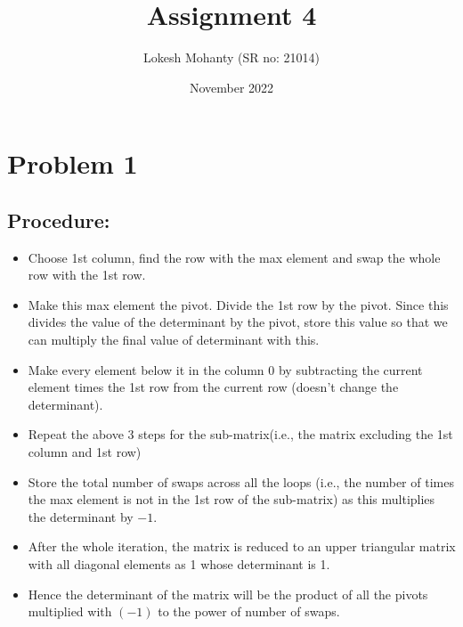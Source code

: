 \documentclass[12pt, letterpaper]{article}
\title{Assignment 4}
\author{Lokesh Mohanty (SR no: 21014)}
\date{November 2022}
\begin{document}
\fontsize{14pt}{18pt}\selectfont

\maketitle

\section*{Problem 1}
\label{sec:prob1}

\subsection*{Procedure:}
\begin{itemize}
\item Choose 1st column, find the row with the max element and swap the whole row with the 1st row.
  
\item Make this max element the pivot. Divide the 1st row by the pivot. Since this divides the value of the determinant by the pivot, store this value so that we can multiply the final value of determinant with this.
  
\item Make every element below it in the column $0$ by subtracting the current element times the 1st row from the current row (doesn't change the determinant).
  
\item Repeat the above 3 steps for the sub-matrix(i.e., the matrix excluding the 1st column and 1st row)
  
\item Store the total number of swaps across all the loops (i.e., the number of times the max element is not in the 1st row of the sub-matrix) as this multiplies the determinant by $-1$.
  
\item After the whole iteration, the matrix is reduced to an upper triangular matrix with all diagonal elements as 1 whose determinant is 1.
  
\item Hence the determinant of the matrix will be the product of all the pivots multiplied with $(-1)$ to the power of number of swaps.
\end{itemize}
\end{document}
